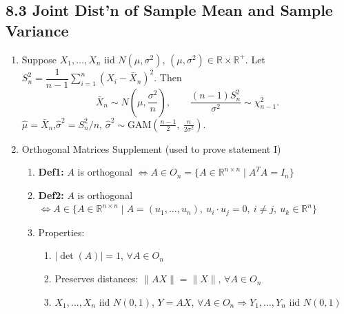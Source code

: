\documentclass[11pt]{article}
\begin{document}
\subsection*{8.3 Joint Dist'n of Sample Mean and Sample Variance}
\begin{enumerate}[label=\Roman*.]
  \item Suppose $X_{1},\dots,X_{n}$ iid $N(\mu,\sigma^{2})$, $(\mu,\sigma^{2})\in\mathbb{R}\times\mathbb{R}^{+}$.
  Let $S_{n}^{2}=\dfrac{1}{n-1}\sum_{i=1}^{n}(X_{i}-\bar X_{n})^{2}$.
  Then
  \[
    \bar X_{n}\sim N\!\left(\mu,\frac{\sigma^{2}}{n}\right),\qquad
    \frac{(n-1)S_{n}^{2}}{\sigma^{2}}\sim\chi^{2}_{n-1}.
  \]
  $\hat\mu=\bar X_{n}$,\quad $\hat\sigma^{2}=S_{n}^{2}/n$,\quad
  $\hat\sigma^{2}\sim\text{GAM}\!\left(\frac{n-1}{2},\ \frac{n}{2\sigma^{2}}\right)$.
  \item Orthogonal Matrices Supplement (used to prove statement I)
  \begin{enumerate}[label=\Alph*.]
    \item \textbf{Def1:} $A$ is orthogonal $\iff A\in O_{n}=\{A\in\mathbb{R}^{n\times n}\mid A^{T}A=I_{n}\}$
    \item \textbf{Def2:} $A$ is orthogonal $\iff A\in\{A\in\mathbb{R}^{n\times n}\mid A=(u_{1},\dots,u_{n}),\ u_{i}\cdot u_{j}=0,\ i\ne j,\ u_{k}\in\mathbb{R}^{n}\}$
    \item Properties:
    \begin{enumerate}[label=\arabic*.]
      \item $|\det(A)|=1$, $\forall A\in O_{n}$
      \item Preserves distances: $\|AX\|=\|X\|$, $\forall A\in O_{n}$
      \item $X_{1},\dots,X_{n}$ iid $N(0,1)$, $Y=AX$, $\forall A\in O_{n}\Rightarrow Y_{1},\dots,Y_{n}$ iid $N(0,1)$
    \end{enumerate}
  \end{enumerate}
\end{enumerate}
\end{document}
